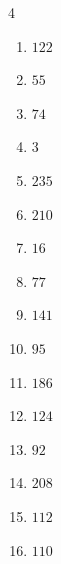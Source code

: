 \begin{multicols}{4}
\begin{enumerate}
  \item $122$


  \item $55$


  \item $74$


  \item $3$


\columnbreak %

  \item $235$


  \item $210$


  \item $16$


  \item $77$


  \item $141$


  \item $95$


  \item $186$


  \item $124$


  \item $92$


  \item $208$


  \item $112$


  \item $110$


\end{enumerate}
\end{multicols}
